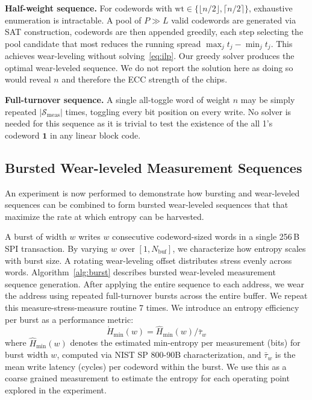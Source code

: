 \textbf{Half-weight sequence.}
For codewords with $\mathrm{wt} \in \{\lfloor n/2 \rfloor, \lceil n/2 \rceil\}$, exhaustive enumeration is intractable. A pool of $P \gg L$ valid codewords are generated via SAT construction, codewords are then appended greedily, each step selecting the pool candidate that most reduces the running spread $\max_j t_j - \min_j t_j$. This achieves wear-leveling without solving~\eqref{eq:ilp}. Our greedy solver produces the optimal wear-leveled sequence. We do not report the solution here as doing so would reveal $n$ and therefore the ECC strength of the chips.

\textbf{Full-turnover sequence.}
A single all-toggle word of weight $n$ may be simply repeated $|\mathcal{S}_{\mathrm{meas}}|$ times, toggling every bit position on every write. No solver is needed for this sequence as it is trivial to test the existence of the all 1's codeword $\mathbf{1}$ in any linear block code.

\subsection{Bursted Wear-leveled Measurement Sequences}
\label{sec:burst}

An experiment is now performed to demonstrate how bursting and wear-leveled sequences can be combined to form bursted wear-leveled sequences that that maximize the rate at which entropy can be harvested.  

A burst of width $w$ writes $w$ consecutive codeword-sized words in a single 256\,B SPI transaction. By varying $w$ over $[1, N_{\mathrm{buf}}]$, we characterize how entropy scales with burst size. A rotating wear-leveling offset distributes stress evenly across words. Algorithm~\ref{alg:burst} describes bursted wear-leveled measurement sequence generation. After applying the entire sequence to each address, we wear the address using repeated full-turnover bursts across the entire buffer. We repeat this measure-stress-measure routine 7 times. We introduce an entropy efficiency per burst as a performance metric:
\begin{equation}
\dot{H}_{\min}(w) = \hat{H}_{\min}(w)/\bar{\tau}_w
\end{equation}
where $\hat{H}_{\min}(w)$ denotes the estimated min-entropy per measurement (bits) for burst width $w$, computed via NIST SP 800-90B characterization, and $\bar{\tau}_w$ is the mean write latency (cycles) per codeword within the burst. We use this as a coarse grained measurement to estimate the entropy for each operating point explored in the experiment.

